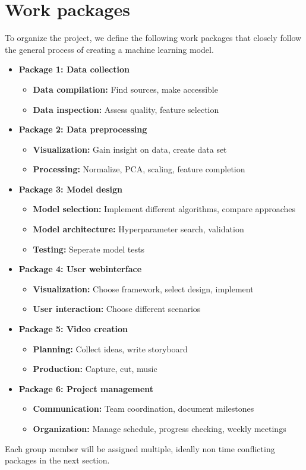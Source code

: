\documentclass[s=english,inputenc=utf8,fontsize=10pt]{ldvarticle}
\begin{document}
\section{Work packages}
To organize the project, we define the following work packages that closely follow the general process of creating a machine learning model. 
\begin{itemize}
	\item \textbf{Package 1: Data collection}
		\begin{itemize}
			\item \textbf{Data compilation:} Find sources, make accessible
			\item \textbf{Data inspection:} Assess quality, feature selection
		\end{itemize}
	\item \textbf{Package 2: Data preprocessing}
		\begin{itemize}
			\item \textbf{Visualization:} Gain insight on data, create data set
			\item \textbf{Processing:} Normalize, PCA, scaling, feature completion
		\end{itemize}
	\item \textbf{Package 3: Model design}
		\begin{itemize}
			\item \textbf{Model selection:} Implement different algorithms, compare approaches
			\item \textbf{Model architecture:} Hyperparameter search, validation
			\item \textbf{Testing:} Seperate model tests
		\end{itemize}
	\item \textbf{Package 4: User webinterface}
		\begin{itemize}
			\item \textbf{Visualization:} Choose framework, select design, implement
			\item \textbf{User interaction:} Choose different scenarios
		\end{itemize}
	\item \textbf{Package 5: Video creation}
		\begin{itemize}
			\item \textbf{Planning:} Collect ideas, write storyboard
			\item \textbf{Production:} Capture, cut, music
		\end{itemize}
	\item \textbf{Package 6: Project management}
		\begin{itemize}
			\item \textbf{Communication:} Team coordination, document milestones
			\item \textbf{Organization:} Manage schedule, progress checking, weekly meetings
		\end{itemize}
\end{itemize}
Each group member will be assigned multiple, ideally non time conflicting packages in the next section.
\newpage
\end{document}
